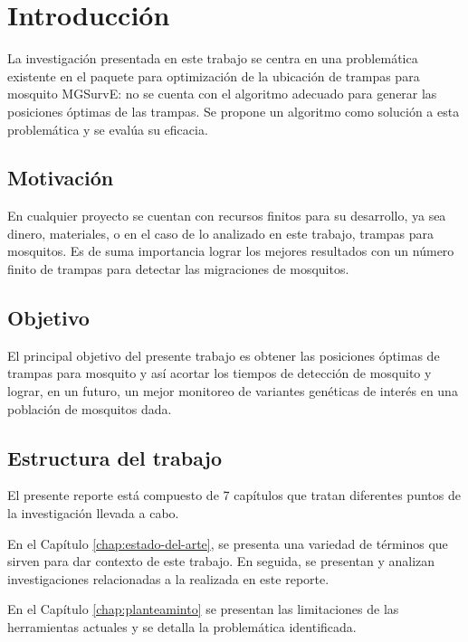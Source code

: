 \graphicspath{ {img/} }

\chapter{Introducción}

La investigación presentada en este trabajo se centra en una problemática
existente en el paquete para optimización de la ubicación de trampas para
mosquito MGSurvE: no se cuenta con el algoritmo adecuado para generar las
posiciones óptimas de las trampas. Se propone un algoritmo como solución a
esta problemática y se evalúa su eficacia. 

\section{Motivación}

En cualquier proyecto se cuentan con recursos finitos para su desarrollo, ya
sea dinero, materiales, o en el caso de lo analizado en este trabajo, trampas
para mosquitos. Es de suma importancia lograr los mejores resultados con un
número finito de trampas para detectar las migraciones de mosquitos.

\section{Objetivo}

El principal objetivo del presente trabajo es obtener las posiciones óptimas
de trampas para mosquito y así acortar los tiempos de detección de mosquito y
lograr, en un futuro, un mejor monitoreo de variantes genéticas de interés en
una población de mosquitos dada.

\section{Estructura del trabajo}

El presente reporte está compuesto de 7 capítulos que tratan diferentes puntos
de la investigación llevada a cabo.

En el Capítulo \ref{chap:estado-del-arte}, se presenta una variedad de
términos que sirven para dar contexto de este trabajo. En seguida, se
presentan y analizan investigaciones relacionadas a la realizada en este
reporte.

En el Capítulo \ref{chap:planteaminto} se presentan las limitaciones de las
herramientas actuales y se detalla la problemática identificada.

